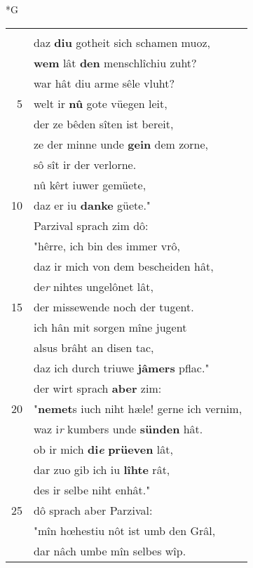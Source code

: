\documentclass[8pt,a4paper,notitlepage]{article}
\begin{document}
\begin{table}[ht]
\begin{minipage}[t]{0.5\linewidth}
\small
\begin{center}*G
\end{center}
\begin{tabular}{rl}
 & \textbf{\begin{large}S\end{large}wâ} werke \textbf{verwürkent} sînen gruoz,\\ 
 & daz \textbf{diu} gotheit sich schamen muoz,\\ 
 & \textbf{wem} lât \textbf{den} menschlîchiu zuht?\\ 
 & war hât diu arme sêle vluht?\\ 
5 & welt ir \textbf{nû} gote vüegen leit,\\ 
 & der ze bêden sîten ist bereit,\\ 
 & ze der minne unde \textbf{gein} dem zorne,\\ 
 & sô sît ir der verlorne.\\ 
 & nû kêrt iuwer gemüete,\\ 
10 & daz er iu \textbf{danke} güete."\\ 
 & Parzival sprach zim dô:\\ 
 & "hêrre, ich bin des immer vrô,\\ 
 & daz ir mich von dem bescheiden hât,\\ 
 & de\textit{r} nihtes ungelônet lât,\\ 
15 & der missewende noch der tugent.\\ 
 & ich hân mit sorgen mîne jugent\\ 
 & alsus brâht an disen tac,\\ 
 & daz ich durch triuwe \textbf{jâmers} pflac."\\ 
 & der wirt sprach \textbf{aber} zim:\\ 
20 & "\textbf{nemet}s iuch niht hæle! gerne ich vernim,\\ 
 & waz i\textit{r} kumbers unde \textbf{sünden} hât.\\ 
 & ob ir mich \textbf{di\textit{e}} \textbf{prüeven} lât,\\ 
 & dar zuo gib ich iu \textbf{lîhte} rât,\\ 
 & des ir selbe niht enhât."\\ 
25 & dô sprach aber Parzival:\\ 
 & "mîn hœhestiu nôt ist umb den Grâl,\\ 
 & dar nâch umbe mîn selbes wîp.\\ 

\end{tabular}
\end{minipage}
\end{table}
\end{document}
